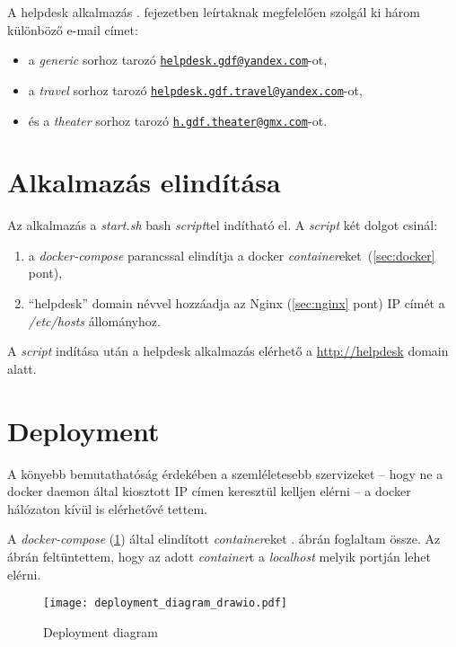 A helpdesk alkalmazás . fejezetben leírtaknak megfelelően szolgál ki három különböző e-mail címet:

\begin{itemize}
	\item a \textit{generic} sorhoz tarozó  \href{mailto:helpdesk.gdf@yandex.com}{\nolinkurl{helpdesk.gdf@yandex.com}}-ot, 
	\item a \textit{travel} sorhoz tarozó  \href{mailto:helpdesk.gdf.travel@yandex.com}{\nolinkurl{helpdesk.gdf.travel@yandex.com}}-ot,
	\item és a \textit{theater} sorhoz tarozó  \href{mailto:h.gdf.theater@gmx.com}{\nolinkurl{h.gdf.theater@gmx.com}}-ot.
\end{itemize}



\section{Alkalmazás elindítása}\label{sec:elinditas}
Az alkalmazás a \textit{start.sh} bash \textit{script}tel indítható el. A \textit{script} két dolgot csinál:
\begin{enumerate}
	\item a \textit{docker-compose} parancssal elindítja a docker \textit{container}eket~(\ref{sec:docker} pont),
	\item  ``helpdesk'' domain névvel hozzáadja az Nginx (\ref{sec:nginx} pont) IP címét a \mbox{\textit{/etc/hosts}} állományhoz.
\end{enumerate}

A \textit{script} indítása után a helpdesk alkalmazás elérhető a  \href{http://helpdesk}{http://helpdesk} domain alatt.


\section{Deployment}
A könyebb bemutathatóság érdekében a szemléletesebb szervizeket --  hogy ne a docker daemon által kiosztott IP címen keresztül kelljen elérni --   a docker hálózaton kívül is elérhetővé tettem. 

A \textit{docker-compose} (\ref{sec:elinditas}) által elindított \textit{container}eket . ábrán foglaltam össze. Az ábrán feltüntettem, hogy az adott \textit{container}t a \textit{localhost} melyik portján lehet elérni.


\begin{figure}[hbt] 
	\centering
	\texttt{[image: deployment\_diagram\_drawio.pdf]}
	\caption[Deployment diagram]{Deployment diagram}
	\label{fig:deployment_diagram}
\end{figure}



